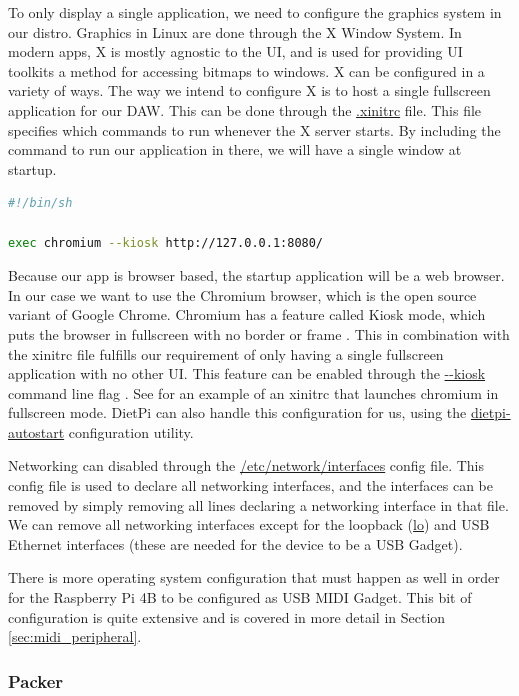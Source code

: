 To only display a single application, we need to configure the graphics system in our
distro. Graphics in Linux are done through the X Window System. In modern apps, X is
mostly agnostic to the UI, and is used for providing UI toolkits a method for accessing
bitmaps to windows. X can be configured in a variety of ways. The way we intend to
configure X is to host a single fullscreen application for our DAW. This can be done
through the \url{.xinitrc} file. This file specifies which commands to run whenever the X
server starts. By including the command to run our application in there, we will have a
single window at startup.

\begin{lstlisting}[language=bash, label={lst:xinitrc}, caption=Example .xinitrc]
#!/bin/sh

exec chromium --kiosk http://127.0.0.1:8080/
\end{lstlisting}

Because our app is browser based, the startup application will be a web browser. In our
case we want to use the Chromium browser, which is the open source variant of Google
Chrome. Chromium has a feature called Kiosk mode, which puts the browser in fullscreen
with no border or frame \autocite{chromiumKioskMode}. This in combination with the xinitrc
file fulfills our requirement of only having a single fullscreen application with no other
UI. This feature can be enabled through the \url{--kiosk} command line flag
\autocite{chromiumKioskMode}. See  for an example of an xinitrc that
launches chromium in fullscreen mode. DietPi can also handle this configuration for us,
using the \url{dietpi-autostart} configuration utility.

Networking can disabled through the \url{/etc/network/interfaces} config file. This config
file is used to declare all networking interfaces, and the interfaces can be removed by
simply removing all lines declaring a networking interface in that file. We can remove all
networking interfaces except for the loopback (\url{lo}) and USB Ethernet interfaces
(these are needed for the device to be a USB Gadget).

There is more operating system configuration that must happen as well in order for the
Raspberry Pi 4B to be configured as USB MIDI Gadget. This bit of configuration is quite
extensive and is covered in more detail in Section \ref{sec:midi_peripheral}.

\subsubsection{Packer}
\label{sec:packer}


